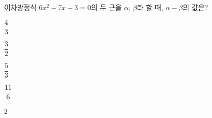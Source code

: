 이차방정식 $6x^2-7x-3=0$의 두 근을 $\alpha$, $\beta$라 할 때, $\alpha-\beta$의 값은? \cond{$\alpha>\beta$}
\begin{choices32}{\rule[-3ex]{0pt}{8ex}$\dfrac{4}{3}$}{\rule[-3ex]{0pt}{8ex}$\dfrac{3}{2}$}{\rule[-3ex]{0pt}{8ex}$\dfrac{5}{3}$}{\rule[-3ex]{0pt}{8ex}$\dfrac{11}{6}$}{\rule[-3ex]{0pt}{8ex}$2$}\end{choices32}
